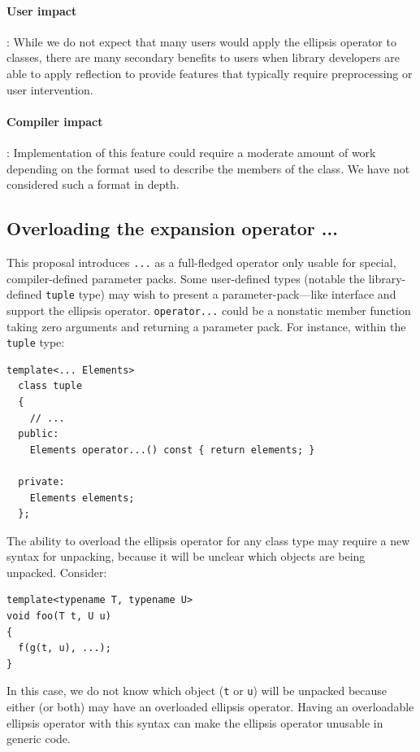 \documentclass{article}
\begin{document}
\paragraph{User impact}: While we do not expect that many users would
apply the ellipsis operator to classes, there are many secondary
benefits to users when library developers are able to apply reflection
to provide features that typically require preprocessing or user
intervention. 

\paragraph{Compiler impact}: Implementation of this feature could
require a moderate amount of work depending on the format used to
describe the members of the class. We have not considered such a
format in depth.

\subsection{Overloading the expansion operator ...}
This proposal introduces \texttt{...} as a full-fledged operator only
usable for special, compiler-defined parameter packs. Some
user-defined types (notable the library-defined \texttt{tuple} type)
may wish to present a parameter-pack---like interface and support the
ellipsis operator. \texttt{operator...} could be a nonstatic member
function taking zero arguments and returning a parameter pack. For
instance, within the \texttt{tuple} type:

\begin{verbatim}
template<... Elements>
  class tuple 
  {
    // ...
  public:
    Elements operator...() const { return elements; }

  private:
    Elements elements;
  };
\end{verbatim}

The ability to overload the ellipsis operator for any class type may
require a new syntax for unpacking, because it will be unclear which
objects are being unpacked. Consider:

\begin{verbatim}
template<typename T, typename U>
void foo(T t, U u)
{
  f(g(t, u), ...);
}
\end{verbatim}

In this case, we do not know which object (\texttt{t} or \texttt{u})
will be unpacked because either (or both) may have an overloaded
ellipsis operator. Having an overloadable ellipsis operator with this
syntax can make the ellipsis operator unusable in generic code.
\end{document}
